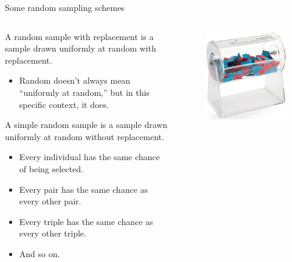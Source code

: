 \documentclass[aspectratio=169]{../latex_main/tntbeamer}  %
\begin{document}
	
		\begin{frame}{Some random sampling schemes}
	    \begin{columns}
	        \begin{column}{.7\textwidth}
	            A \alert{random sample} with replacement is a sample drawn uniformly at random with replacement.

	            \begin{itemize}
	                \item Random doesn’t always mean “uniformly at random,” but in this specific context, it does.
	            \end{itemize}
	            A \alert{simple random sample} is a sample drawn uniformly at random without replacement.
                 \begin{itemize}
	                \item Every individual has the same chance of being selected.
	                \item Every pair has the same chance as every other pair.
	                \item Every triple has the same chance as every other triple.
	                \item And so on.

	            \end{itemize}
	        \end{column}
	        
	        \begin{column}{.3\textwidth}
	            \begin{figure}
	                \centering
	                \includegraphics[scale=.5]{Bild14}
	            \end{figure}

	        \end{column}
	        
	    \end{columns}
	    
	\end{frame}
	
\end{document}
